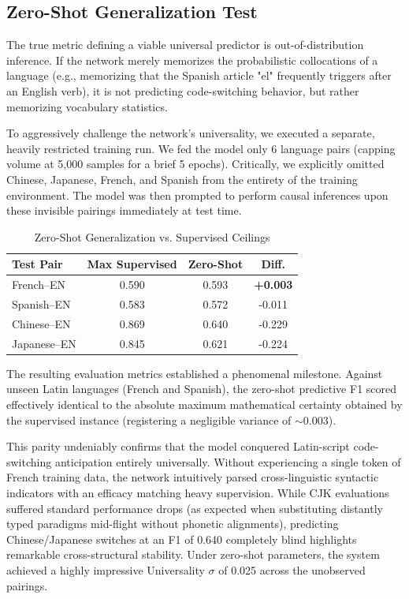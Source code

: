 \documentclass[sigconf,nonacm]{acmart}
\begin{document}
\subsection{Zero-Shot Generalization Test}
The true metric defining a viable universal predictor is out-of-distribution inference. If the network merely memorizes the probabilistic collocations of a language (e.g., memorizing that the Spanish article "el" frequently triggers after an English verb), it is not predicting code-switching behavior, but rather memorizing vocabulary statistics.

To aggressively challenge the network's universality, we executed a separate, heavily restricted training run. We fed the model only 6 language pairs (capping volume at 5,000 samples for a brief 5 epochs). Critically, we explicitly omitted Chinese, Japanese, French, and Spanish from the entirety of the training environment. The model was then prompted to perform causal inferences upon these invisible pairings immediately at test time.

\begin{table}[h]
\centering
\caption{Zero-Shot Generalization vs. Supervised Ceilings}
\label{tab:zeroshot}
\begin{tabular}{lccc}
\toprule
\textbf{Test Pair} & \textbf{Max Supervised} & \textbf{Zero-Shot} & \textbf{Diff.} \\
\midrule
French--EN & 0.590 & 0.593 & \textbf{+0.003} \\
Spanish--EN & 0.583 & 0.572 & -0.011 \\
\midrule
Chinese--EN & 0.869 & 0.640 & -0.229 \\
Japanese--EN & 0.845 & 0.621 & -0.224 \\
\bottomrule
\end{tabular}
\end{table}

The resulting evaluation metrics established a phenomenal milestone. Against unseen Latin languages (French and Spanish), the zero-shot predictive F1 scored effectively identical to the absolute maximum mathematical certainty obtained by the supervised instance (registering a negligible variance of \(\sim 0.003\)). 

This parity undeniably confirms that the model conquered Latin-script code-switching anticipation entirely universally. Without experiencing a single token of French training data, the network intuitively parsed cross-linguistic syntactic indicators with an efficacy matching heavy supervision. While CJK evaluations suffered standard performance drops (as expected when substituting distantly typed paradigms mid-flight without phonetic alignments), predicting Chinese/Japanese switches at an F1 of 0.640 completely blind highlights remarkable cross-structural stability. Under zero-shot parameters, the system achieved a highly impressive Universality \(\sigma\) of 0.025 across the unobserved pairings.
\end{document}
